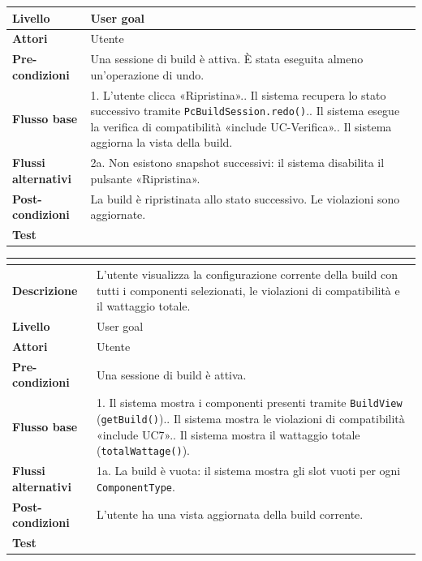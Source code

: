 \documentclass[12pt,a4paper]{article}
\begin{document}
{\begin{tabularx}{\textwidth}{|>{\bfseries}p{3.8cm}|X|}
\hline
Livello & User goal \\
\hline
Attori & Utente \\
\hline
Pre-condizioni & Una sessione di build è attiva. È stata eseguita almeno un'operazione di undo. \\
\hline
Flusso base & 1. L'utente clicca «Ripristina».\newline 2. Il sistema recupera lo stato successivo tramite \texttt{PcBuildSession.redo()}.\newline 3. Il sistema esegue la verifica di compatibilità «include UC-Verifica».\newline 4. Il sistema aggiorna la vista della build. \\
\hline
Flussi alternativi & 2a. Non esistono snapshot successivi: il sistema disabilita il pulsante «Ripristina». \\
\hline
Post-condizioni & La build è ripristinata allo stato successivo. Le violazioni sono aggiornate. \\
\hline
Test & \\
\hline
\end{tabularx}
\vspace{8pt}
\noindent
\begin{tabularx}{\textwidth}{|>{\bfseries}p{3.8cm}|X|}
\hline
\multicolumn{2}{|l|}{\textbf{UC6 --- Visualizza build}} \\
\hline
Descrizione & L'utente visualizza la configurazione corrente della build con tutti i componenti selezionati, le violazioni di compatibilità e il wattaggio totale. \\
\hline
Livello & User goal \\
\hline
Attori & Utente \\
\hline
Pre-condizioni & Una sessione di build è attiva. \\
\hline
Flusso base & 1. Il sistema mostra i componenti presenti tramite \texttt{BuildView} (\texttt{getBuild()}).\newline 2. Il sistema mostra le violazioni di compatibilità «include UC7».\newline 3. Il sistema mostra il wattaggio totale (\texttt{totalWattage()}). \\
\hline
Flussi alternativi & 1a. La build è vuota: il sistema mostra gli slot vuoti per ogni \texttt{ComponentType}. \\
\hline
Post-condizioni & L'utente ha una vista aggiornata della build corrente. \\
\hline
Test & \\
\hline
\end{tabularx}
}
\end{document}
